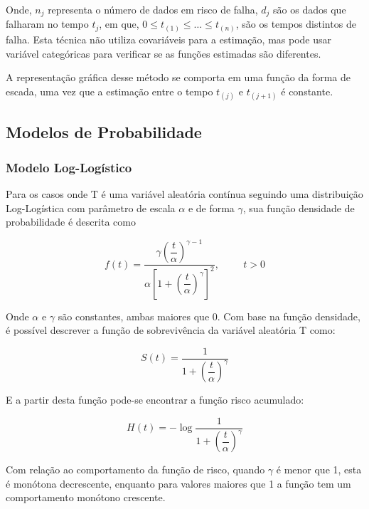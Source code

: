 \documentclass[a4paper,12pt]{article}
\begin{document}
Onde, $n_j$ representa o número de dados em risco de falha, $d_j$ são os dados que falharam no tempo $t_j$, em que, $0 \le t_{(1)} \le \hdots \le t_{(n)}$, são os tempos distintos de falha. Esta técnica não utiliza covariáveis para a estimação, mas pode usar variável categóricas para verificar se as funções estimadas são diferentes. 

A representação gráfica desse método se comporta em uma função da forma de escada, uma vez que a estimação entre o tempo $t_{(j)}$ e $t_{(j+1)}$ é constante.


\subsection{Modelos de Probabilidade}

\subsubsection{Modelo Log-Logístico}

Para os casos onde T é uma variável aleatória contínua seguindo uma distribuição Log-Logística com parâmetro de escala $\alpha$ e de forma $\gamma$, sua função densidade de probabilidade é descrita como

\begin{equation}
  f(t) = \dfrac{\gamma\left(\dfrac{t}{\alpha}\right)^{\gamma - 1}}{\alpha\left[1+\left(\dfrac{t}{\alpha}\right)^{\gamma}\right]^2}, \hspace{1cm} t > 0
\end{equation}

Onde $\alpha$ e $\gamma$ são constantes, ambas maiores que 0. Com base na função densidade, é possível descrever a função de sobrevivência da variável aleatória T como:

\begin{equation} \label{eq: LLSurv}
  S(t) = \dfrac{1}{1 + \left(\dfrac{t}{\alpha}\right)^{\gamma}}
\end{equation}

E a partir desta função pode-se encontrar a função risco acumulado:

\begin{equation} \label{eq: HazLL}
H(t) = - \log{\dfrac{1}{1 + \left(\dfrac{t}{\alpha}\right)^{\gamma}}}
\end{equation}

Com relação ao comportamento da função de risco, quando $\gamma$ é menor que 1, esta é monótona decrescente, enquanto para valores maiores que 1 a função tem um comportamento monótono crescente.
\end{document}
